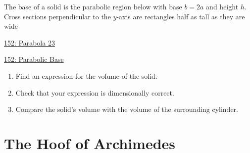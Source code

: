 \documentclass{ximera}
\begin{document}
\begin{question} \label{QLkdfmmdf}
The base of a solid is the parabolic region below with base $b=2a$ and height $h$. Cross sections perpendicular to the $y$-axis are rectangles half as tall as they are wide

\begin{onlineOnly}
    \begin{center}
\end{center}
\end{onlineOnly}

\href{ https://www.desmos.com/calculator/mbxrsmdho8}{152: Parabola 23}

\begin{onlineOnly}
    \begin{center}
\end{center}
\end{onlineOnly}

\href{https://www.desmos.com/3d/gdebhnchrz}{152: Parabolic Base}


\begin{enumerate}

\item Find an expression for the volume of the solid. 

\item Check that your expression is dimensionally correct.

\item Compare the solid's volume with the volume of the surrounding cylinder.


\end{enumerate}
\end{question}

\section{The Hoof of Archimedes}
\end{document}
